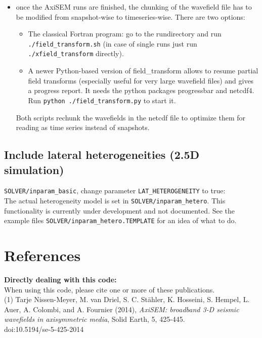 \documentclass{article}
\begin{document}
\begin{itemize}
    \item once the AxiSEM runs are finished, the chunking of the wavefield file has to be 
    modified from snapshot-wise to timeseries-wise. There are two options:
    \begin{itemize}
      \item The classical Fortran program: go to the rundirectory and run
      \verb|./field_transform.sh| (in case of single runs just run \verb|./xfield_transform|
      directly). 
      \item A newer Python-based version of field\_transform allows to resume partial field 
      transforms (especially useful for very large wavefield files) and gives a progress
      report. It needs the python packages progressbar and netcdf4.\\
      Run \verb|python ./field_transform.py| to start it.
    \end{itemize}
    Both scripts rechunk the wavefields in the netcdf file to optimize them for
      reading as time series instead of snapshots.
    
    
    

\end{itemize}


\subsection{Include lateral heterogeneities (2.5D simulation)}
\verb|SOLVER/inparam_basic|, change parameter \verb|LAT_HETEROGENEITY| to true:\\
The actual heterogeneity model is set in \verb|SOLVER/inparam_hetero|.
This functionality is currently under development and not documented. See the example
files \verb|SOLVER/inparam_hetero.TEMPLATE| for an idea of what to do.


\newpage
\section{References}

\noindent \textbf{Directly dealing with this code:}\vspace*{0.2cm}\\
When using this code, please cite one or more of these publications. \vspace*{0.2cm}\\


(1) Tarje Nissen-Meyer, M. van Driel, S. C. Stähler, K. Hosseini, S. Hempel, L. Auer,
A. Colombi, and A. Fournier (2014), \textit{AxiSEM: broadband 3-D seismic wavefields
in axisymmetric media},  Solid Earth, 5, 425-445. \\
doi:10.5194/se-5-425-2014\\
\end{document}

